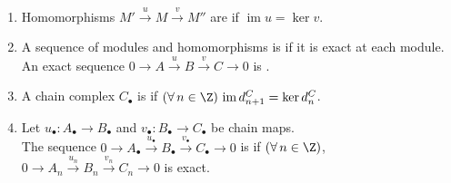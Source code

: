 \begin{definition} \label{def:exact-sequences-and-complexes} 
\begin{enumerate}[label=(\roman*)]
\setlength{\itemsep}{0pt}
\item Homomorphisms $M'\xrightarrow{u}M\xrightarrow{v}M''$ are  if $\operatorname{im}u=\ker v$.
\item A sequence of modules and homomorphisms is  if it is exact at each module. An exact sequence $0\to A\xrightarrow{u}B\xrightarrow{v}C\to0$ is .
\item A chain complex $C_\bullet$ is  if $(\forall\,n\in\Z)\,\operatorname{im}d^C_{n+1}=\ker d^C_n$.
\item Let $u_\bullet:A_\bullet\to B_\bullet$ and $v_\bullet:B_\bullet\to C_\bullet$ be chain maps.\\
The sequence $0\to A_\bullet\xrightarrow{u_\bullet}B_\bullet\xrightarrow{v_\bullet}C_\bullet\to0$ is  if $(\forall\,n\in\Z)$, $0\to A_n\xrightarrow{u_n}B_n\xrightarrow{v_n}C_n\to0$ is exact.
\end{enumerate}
\end{definition}

